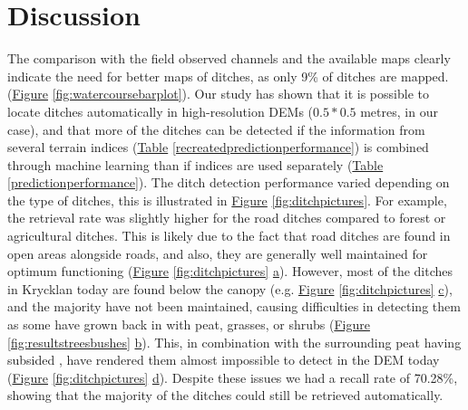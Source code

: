 \documentclass[11pt, review]{elsarticle} %
\begin{document}
\section{Discussion}

The comparison with the field observed channels and the available maps clearly indicate the need for better maps of ditches, as only 9\% of ditches are mapped.  (\hyperref[fig:watercoursebarplot]{Figure} \ref{fig:watercoursebarplot}). Our study has shown that it is possible to locate ditches automatically in high-resolution DEMs ($0.5  * 0.5 $ metres, in our case), and that more of the ditches can be detected if the information from several terrain indices (\hyperref[recreatedpredictionperformance]{Table} \ref{recreatedpredictionperformance}) is combined through machine learning than if indices are used separately (\hyperref[predictionperformance]{Table} \ref{predictionperformance}).
The ditch detection performance varied depending on the type of ditches, this is illustrated in \hyperref[fig:ditchpictures]{Figure} \ref{fig:ditchpictures}. For example, the retrieval rate was slightly higher for the road ditches compared to forest or agricultural ditches. This is likely due to the fact that  road ditches are found in open areas alongside roads, and also,   they are generally well maintained for optimum functioning (\hyperref[fig:ditchpictures]{Figure} \ref{fig:ditchpictures} \hyperref[fig:ditchpictures]{a}). However, most of the ditches in Krycklan today are found below the canopy (e.g. \hyperref[fig:ditchpictures]{Figure} \ref{fig:ditchpictures} \hyperref[fig:ditchpictures]{c}), and the majority have not been maintained, causing difficulties in detecting them as some have grown back in with peat, grasses, or shrubs (\hyperref[fig:resultstreesbushes]{Figure} \ref{fig:resultstreesbushes} \hyperref[fig:resultstreesbushes]{b}). This, in combination with the surrounding peat having subsided \citep{heikurainen}, have rendered them almost impossible to detect in the DEM today (\hyperref[fig:ditchpictures]{Figure} \ref{fig:ditchpictures} \hyperref[fig:ditchpictures]{d}). Despite these issues we had a recall rate of 70.28\%, showing that the majority of the ditches could still be retrieved automatically.
\end{document}
